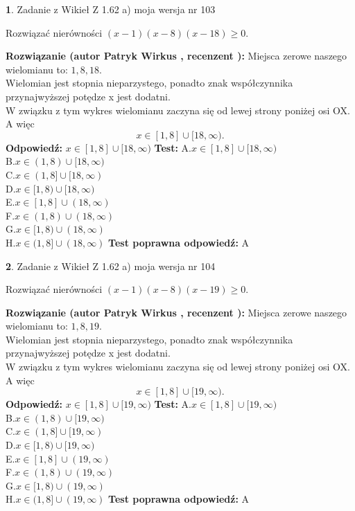\documentclass[12pt, a4paper]{article}
\theoremstyle{definition} %
\newtheorem{zad}{}
\newcommand{\zadStart}[1]{\begin{zad}#1\newline}
\newcommand{\zadStop}{\end{zad}}
\newcommand{\rozwStart}[2]{\noindent \textbf{Rozwiązanie (autor #1 , recenzent #2): }\newline}
\newcommand{\rozwStop}{\newline}
\newcommand{\odpStart}{\noindent \textbf{Odpowiedź:}\newline}
\newcommand{\odpStop}{\newline}
\newcommand{\testStart}{\noindent \textbf{Test:}\newline}
\newcommand{\testStop}{\newline}
\newcommand{\kluczStart}{\noindent \textbf{Test poprawna odpowiedź:}\newline}
\newcommand{\kluczStop}{\newline}
\begin{document}
\zadStart{Zadanie z Wikieł Z 1.62 a) moja wersja nr 103}

Rozwiązać nierówności $(x-1)(x-8)(x-18)\ge0$.
\zadStop
\rozwStart{Patryk Wirkus}{}
Miejsca zerowe naszego wielomianu to: $1, 8, 18$.\\
Wielomian jest stopnia nieparzystego, ponadto znak współczynnika przy\linebreak najwyższej potędze x jest dodatni.\\ W związku z tym wykres wielomianu zaczyna się od lewej strony poniżej osi OX. A więc $$x \in [1,8] \cup [18,\infty).$$
\rozwStop
\odpStart
$x \in [1,8] \cup [18,\infty)$
\odpStop
\testStart
A.$x \in [1,8] \cup [18,\infty)$\\
B.$x \in (1,8) \cup [18,\infty)$\\
C.$x \in (1,8] \cup [18,\infty)$\\
D.$x \in [1,8) \cup [18,\infty)$\\
E.$x \in [1,8] \cup (18,\infty)$\\
F.$x \in (1,8) \cup (18,\infty)$\\
G.$x \in [1,8) \cup (18,\infty)$\\
H.$x \in (1,8] \cup (18,\infty)$
\testStop
\kluczStart
A
\kluczStop



\zadStart{Zadanie z Wikieł Z 1.62 a) moja wersja nr 104}

Rozwiązać nierówności $(x-1)(x-8)(x-19)\ge0$.
\zadStop
\rozwStart{Patryk Wirkus}{}
Miejsca zerowe naszego wielomianu to: $1, 8, 19$.\\
Wielomian jest stopnia nieparzystego, ponadto znak współczynnika przy\linebreak najwyższej potędze x jest dodatni.\\ W związku z tym wykres wielomianu zaczyna się od lewej strony poniżej osi OX. A więc $$x \in [1,8] \cup [19,\infty).$$
\rozwStop
\odpStart
$x \in [1,8] \cup [19,\infty)$
\odpStop
\testStart
A.$x \in [1,8] \cup [19,\infty)$\\
B.$x \in (1,8) \cup [19,\infty)$\\
C.$x \in (1,8] \cup [19,\infty)$\\
D.$x \in [1,8) \cup [19,\infty)$\\
E.$x \in [1,8] \cup (19,\infty)$\\
F.$x \in (1,8) \cup (19,\infty)$\\
G.$x \in [1,8) \cup (19,\infty)$\\
H.$x \in (1,8] \cup (19,\infty)$
\testStop
\kluczStart
A
\kluczStop
\end{document}
